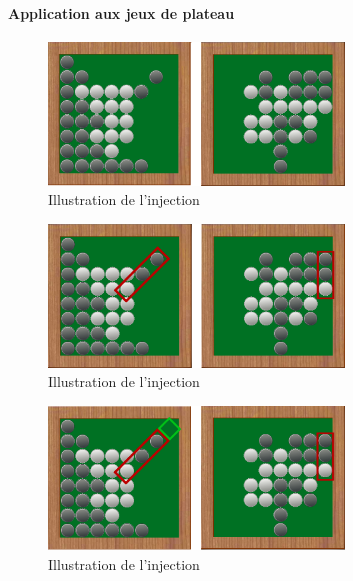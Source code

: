 \paragraph{Application aux jeux de plateau}

\begin{figure}[H] 
\begin{center}
\includegraphics[width=0.7\textwidth]{files/raisonneur/cbs_reco0} 
\end{center}
\caption{Illustration de l'injection} 
\label{img_cbs_reco0}
\end{figure}

\begin{figure}[H] 
\begin{center}
\includegraphics[width=0.7\textwidth]{files/raisonneur/cbs_reco1} 
\end{center}
\caption{Illustration de l'injection} 
\label{img_cbs_reco1}
\end{figure}

\begin{figure}[H] 
\begin{center}
\includegraphics[width=0.7\textwidth]{files/raisonneur/cbs_reco2} 
\end{center}
\caption{Illustration de l'injection} 
\label{img_cbs_reco2}
\end{figure}

